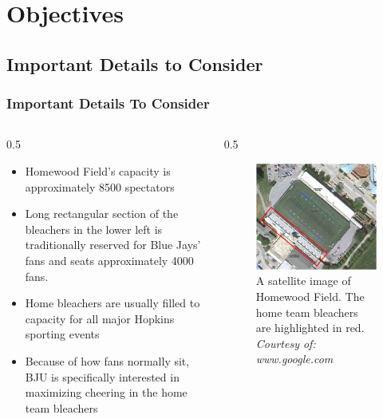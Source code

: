 \documentclass[compress,handout,10pt]{beamer}
\let\olditem\item
\renewcommand{\item}{\setlength{\itemsep}{0.5\baselineskip}\olditem}
\begin{document}
\section {Objectives}

\subsection{Important Details to Consider}

\begin{frame}
	\frametitle {Important Details To Consider}
		\begin {columns}
			\begin {column}{0.5\textwidth}
				\begin{itemize}
					\item Homewood Field's capacity is approximately 8500 spectators \cite{wiki}
					\item Long rectangular section of the bleachers in the lower left is traditionally reserved for Blue Jays' fans and seats approximately 4000 fans.
					\item Home bleachers are usually filled to capacity for all major Hopkins sporting events
					\item Because of how fans normally sit, BJU is specifically interested in maximizing cheering in the home team bleachers
				\end {itemize}
			\end {column}
			\begin {column}{0.5\textwidth}
			\begin {figure}
				\begin{center}
    			\includegraphics [width=2in] {Bleachers.png}
    			\caption {{\tiny A satellite image of Homewood Field. The home team bleachers are highlighted in red. \textit{Courtesy of: www.google.com}}}
    		\end{center}
    	\end{figure}	
			\end {column}
		\end {columns}
\end{frame}
\end{document}
